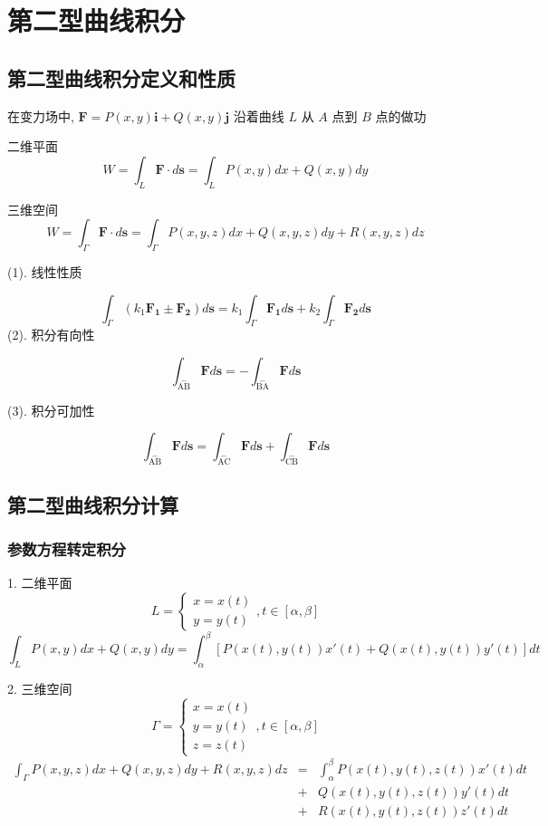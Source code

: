 \section{第二型曲线积分}
\subsection{第二型曲线积分定义和性质}
\begin{definition}[第二型曲线积分]
	在变力场中, $\boldsymbol{F} = P(x,y)\boldsymbol{i} + Q(x,y)\boldsymbol{j}$ 沿着曲线 $L$ 从 $A$ 点到 $B$ 点的做功

	二维平面
	$$W = \int_{L}\boldsymbol{F}\cdot d\boldsymbol{s} = \int_{L}P(x,y)dx+Q(x,y)dy$$

	三维空间
	$$W = \int_{\Gamma}\boldsymbol{F}\cdot d\boldsymbol{s} = \int_{\Gamma}P(x,y,z)dx+Q(x,y,z)dy+R(x,y,z)dz$$
\end{definition}
\begin{corollary}
	(1). 线性性质

	$$\int_{\Gamma}(k_{1}\boldsymbol{F_{1}}\pm \boldsymbol{F_{2}})d\boldsymbol{s} = k_{1}\int_{\Gamma}\boldsymbol{F_{1}}d\boldsymbol{s} + k_{2}\int_{\Gamma}\boldsymbol{F_{2}}d\boldsymbol{s}$$
	(2). 积分有向性
	
	$$\int_{\mathop{AB}\limits^{\frown}}\boldsymbol{F}d\boldsymbol{s} = - \int_{\mathop{BA}\limits^{\frown}}\boldsymbol{F}d\boldsymbol{s}$$
	
	(3). 积分可加性
	
	$$\int_{\mathop{AB}\limits^{\frown}}\boldsymbol{F}d\boldsymbol{s} = \int_{\mathop{AC}\limits^{\frown}}\boldsymbol{F}d\boldsymbol{s} + \int_{\mathop{CB}\limits^{\frown}}\boldsymbol{F}d\boldsymbol{s}$$
\end{corollary}
\subsection{第二型曲线积分计算}
\subsubsection{参数方程转定积分}
\begin{theorem}
	1. 二维平面
	$$ L = \begin{cases}
		x = x(t)\\
		y = y(t)
	\end{cases}, t\in[\alpha,\beta]$$
	$$\int_{L}P(x,y)dx+Q(x,y)dy = \int_{\alpha}^{\beta}[P(x(t),y(t))x'(t)+Q(x(t),y(t))y'(t)]dt$$

	2. 三维空间
	$$\Gamma = \begin{cases}
		x = x(t)\\
		y = y(t)\\
		z = z(t)
	\end{cases}, t\in[\alpha,\beta]$$
	\begin{eqnarray*}
		\int_{\Gamma}P(x,y,z)dx+Q(x,y,z)dy+R(x,y,z)dz & = & \int_{\alpha}^{\beta}P(x(t),y(t),z(t))x'(t)dt \\
		& + & Q(x(t),y(t),z(t))y'(t)dt \\
		& + & R(x(t),y(t),z(t))z'(t)dt
	\end{eqnarray*}
\end{theorem}
